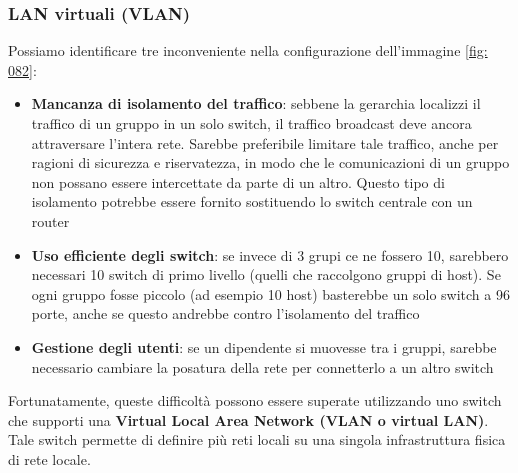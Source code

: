 \documentclass[11pt,a4paper]{article}
\begin{document}
{\subsubsection{LAN virtuali (VLAN)}
Possiamo identificare tre inconveniente nella configurazione dell'immagine \ref{fig: 082}:
\begin{itemize}
	\item \textbf{Mancanza di isolamento del traffico}: sebbene la gerarchia localizzi il traffico di un gruppo in un solo switch, il traffico broadcast deve ancora attraversare l'intera rete. Sarebbe preferibile limitare tale traffico, anche per ragioni di sicurezza e riservatezza, in modo che le comunicazioni di un gruppo non possano essere intercettate da parte di un altro. Questo tipo di isolamento potrebbe essere fornito sostituendo lo switch centrale con un router
	\item \textbf{Uso efficiente degli switch}: se invece di 3 grupi ce ne fossero 10, sarebbero necessari 10 switch di primo livello (quelli che raccolgono gruppi di host). Se ogni gruppo fosse piccolo (ad esempio 10 host) basterebbe un solo switch a 96 porte, anche se questo andrebbe contro l'isolamento del traffico
	\item \textbf{Gestione degli utenti}: se un dipendente si muovesse tra i gruppi, sarebbe necessario cambiare la posatura della rete per connetterlo a un altro switch
\end{itemize}
Fortunatamente, queste difficoltà possono essere superate utilizzando uno switch che supporti una \textbf{Virtual Local Area Network (VLAN o virtual LAN)}. Tale switch permette di definire più reti locali su una singola infrastruttura fisica di rete locale.

}
\end{document}

